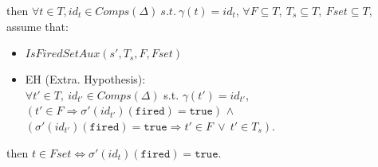 \documentclass[dvipsnames,12pt]{article}
\begin{document}
\begin{lemma}
  \label{lem:fe-equal-fset-aux}
  \fehyps{} then
  $\forall{}t\in{}T,id_t\in{}Comps(\Delta)~s.t.~\gamma(t)=id_t$,
  $\forall{}F\subseteq{}T,~T_s\subseteq{}T,~Fset\subseteq{}T,$
  assume that:
  \begin{itemize}
  \item $IsFiredSetAux(s',T_s,F,Fset)$
  \item EH (Extra. Hypothesis):\\
    $\forall{}t'\in{}T,~id_{t'}\in{}Comps(\Delta)$
    s.t. $\gamma(t')=id_{t'}$,\\
    $(t'\in{}F\Rightarrow\sigma'(id_{t'})(\texttt{fired})=\mathtt{true})$
    $\land$
    $(\sigma'(id_{t'})(\texttt{fired})=\mathtt{true}\Rightarrow{}t'\in{}F~\lor~{}t'\in{}T_s)$.
  \end{itemize}
  then
  $t\in{}Fset\Leftrightarrow\sigma'(id_t)(\texttt{fired})=\mathtt{true}$.
\end{lemma}
\end{document}

